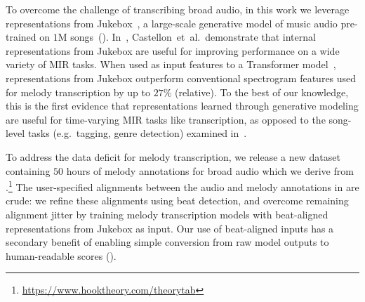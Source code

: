 To overcome the challenge of transcribing broad audio, in this work we leverage representations from Jukebox~\cite{dhariwal2020jukebox}, a large-scale generative model of music audio pre-trained on $1$M songs~(). 
In~\cite{castellon2021calm}, Castellon~et~al.\ demonstrate that internal representations from Jukebox are useful for improving performance on a wide variety of MIR tasks. 
When used as input features to a Transformer model~\cite{vaswani2017attention}, representations from Jukebox outperform conventional spectrogram features used for melody transcription by 
up to $27$\% (relative). 
To the best of our knowledge, this is the first evidence that representations learned through generative modeling are useful for time-varying MIR tasks like transcription, as opposed to the song-level tasks (e.g.~tagging, genre detection) examined in~\cite{castellon2021calm}.

To address the data deficit for melody transcription, 
we release a new dataset containing $50$ hours of melody annotations for broad audio 
which we derive 
from \hooktheory.\footnote{\url{https://www.hooktheory.com/theorytab}} 
The user-specified alignments between the audio and melody annotations in \hooktheory{} are crude: we refine these alignments using beat detection, 
and overcome remaining alignment jitter by training melody transcription models with beat-aligned representations from Jukebox as input. 
Our use of beat-aligned inputs 
has a secondary benefit of enabling simple conversion from raw model outputs to human-readable scores ().

